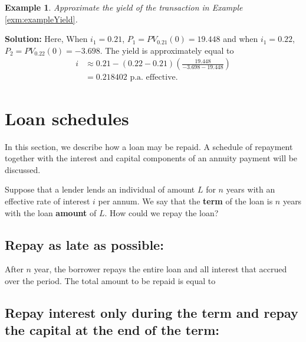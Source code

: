\documentclass[
]{book}
\theoremstyle{definition}
\theoremstyle{definition}
\newtheorem{example}{Example}[chapter]
\theoremstyle{definition}
\theoremstyle{definition}
\theoremstyle{remark}
\begin{document}
\begin{example}
\emph{Approximate the yield of the transaction in Example}
\ref{exm:exampleYield}\emph{.}
\end{example}

\textbf{Solution:} Here, When \(i_1 = 0.21\), \(P_1 = PV_{0.21}(0) = 19.448\) and
when \(i_1 = 0.22\), \(P_2 = PV_{0.22}(0) = -3.698.\) The yield is
approximately equal to \[\begin{aligned}
 i &\approx 0.21 - (0.22 - 0.21) \left(  \frac{19.448}{-3.698 - 19.448} \right) \\
   &= 0.218402 \text{ p.a. effective.}\end{aligned}\]

\hypertarget{loan-schedules}{%
\section{Loan schedules}\label{loan-schedules}}

In this section, we describe how a loan may be repaid. A schedule of
repayment together with the interest and capital components of an
annuity payment will be discussed.

Suppose that a lender lends an individual of amount \(L\) for \(n\) years
with an effective rate of interest \(i\) per annum. We say that the
\textbf{term} of the loan is \(n\) years with the loan \textbf{amount} of \(L\). How
could we repay the loan?

\hypertarget{repay-as-late-as-possible}{%
\subsection*{Repay as late as possible:}\label{repay-as-late-as-possible}}

After \(n\) year, the borrower repays the entire loan and all interest
that accrued over the period. The total amount to be repaid is equal to

\hypertarget{repay-interest-only-during-the-term-and-repay-the-capital-at-the-end-of-the-term}{%
\subsection*{Repay interest only during the term and repay the capital at the end of the term:}\label{repay-interest-only-during-the-term-and-repay-the-capital-at-the-end-of-the-term}}
\end{document}

